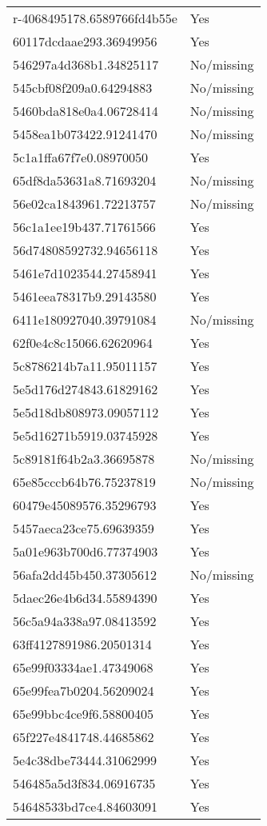 \begin{tabular}{ll}
r-4068495178.6589766fd4b55e & Yes \\
60117dcdaae293.36949956 & Yes \\
546297a4d368b1.34825117 & No/missing \\
545cbf08f209a0.64294883 & No/missing \\
5460bda818e0a4.06728414 & No/missing \\
5458ea1b073422.91241470 & No/missing \\
5c1a1ffa67f7e0.08970050 & Yes \\
65df8da53631a8.71693204 & No/missing \\
56e02ca1843961.72213757 & No/missing \\
56c1a1ee19b437.71761566 & Yes \\
56d74808592732.94656118 & Yes \\
5461e7d1023544.27458941 & Yes \\
5461eea78317b9.29143580 & Yes \\
6411e180927040.39791084 & No/missing \\
62f0e4c8c15066.62620964 & Yes \\
5c8786214b7a11.95011157 & Yes \\
5e5d176d274843.61829162 & Yes \\
5e5d18db808973.09057112 & Yes \\
5e5d16271b5919.03745928 & Yes \\
5c89181f64b2a3.36695878 & No/missing \\
65e85cccb64b76.75237819 & No/missing \\
60479e45089576.35296793 & Yes \\
5457aeca23ce75.69639359 & Yes \\
5a01e963b700d6.77374903 & Yes \\
56afa2dd45b450.37305612 & No/missing \\
5daec26e4b6d34.55894390 & Yes \\
56c5a94a338a97.08413592 & Yes \\
63ff4127891986.20501314 & Yes \\
65e99f03334ae1.47349068 & Yes \\
65e99fea7b0204.56209024 & Yes \\
65e99bbc4ce9f6.58800405 & Yes \\
65f227e4841748.44685862 & Yes \\
5e4c38dbe73444.31062999 & Yes \\
546485a5d3f834.06916735 & Yes \\
54648533bd7ce4.84603091 & Yes \\

\end{tabular}
